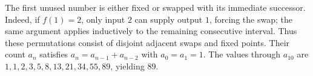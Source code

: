 The first unused number is either fixed or swapped with its immediate successor. Indeed, if $f(1)=2$, only input $2$ can supply output $1$, forcing the swap; the same argument applies inductively to the remaining consecutive interval. Thus these permutations consist of disjoint adjacent swaps and fixed points. Their count $a_n$ satisfies $a_n=a_{n-1}+a_{n-2}$ with $a_0=a_1=1$. The values through $a_{10}$ are $1,1,2,3,5,8,13,21,34,55,89$, yielding $\boxed{89}$.
